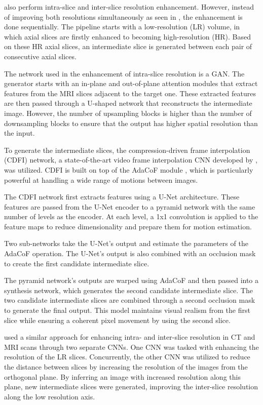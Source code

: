 \textcite{Nimitha2024} also perform intra-slice and inter-slice resolution enhancement. However, instead of improving both resolutions simultaneously as seen in \textcite{Zhang2024, Fang2022}, the enhancement is done sequentially. The pipeline starts with a low-resolution (LR) volume, in which axial slices are firstly enhanced to becoming high-resolution (HR). Based on these HR axial slices, an intermediate slice is generated between each pair of consecutive axial slices.
\par
The network used in the enhancement of intra-slice resolution is a GAN. The generator starts with an in-plane and out-of-plane attention modules that extract features from the MRI slices adjacent to the target one. These extracted features are then passed through a U-shaped network that reconstructs the intermediate image. However, the number of upsampling blocks is higher than the number of downsampling blocks to ensure that the output has higher spatial resolution than the input.
\par
To generate the intermediate slices, the compression-driven frame interpolation (CDFI) network, a state-of-the-art video frame interpolation CNN developed by \textcite{Ding2021}, was utilized. CDFI is built on top of the AdaCoF module \parencite{Lee2020}, which is particularly powerful at handling a wide range of motions between images.
\par 
The CDFI network first extracts features using a U-Net architecture. These features are passed from the U-Net encoder to a pyramid network with the same number of levels as the encoder. At each level, a 1x1 convolution is applied to the feature maps to reduce dimensionality and prepare them for motion estimation.
\par
Two sub-networks take the U-Net's output and estimate the parameters of the AdaCoF operation. The U-Net's output is also combined with an occlusion mask to create the first candidate intermediate slice.
\par
The pyramid network's outputs are warped using AdaCoF and then passed into a synthesis network, which generates the second candidate intermediate slice. The two candidate intermediate slices are combined through a second occlusion mask to generate the final output. This model maintains visual realism from the first slice while ensuring a coherent pixel movement by using the second slice.
\par
\textcite{Georgescu2020} used a similar approach for enhancing intra- and inter-slice resolution in CT and MRI scans through two separate CNNs. One CNN was tasked with enhancing the resolution of the LR slices. Concurrently, the other CNN was utilized to reduce the distance between slices by increasing the resolution of the images from the orthogonal plane. By inferring an image with increased resolution along this plane, new intermediate slices were generated, improving the inter-slice resolution along the low resolution axis.
